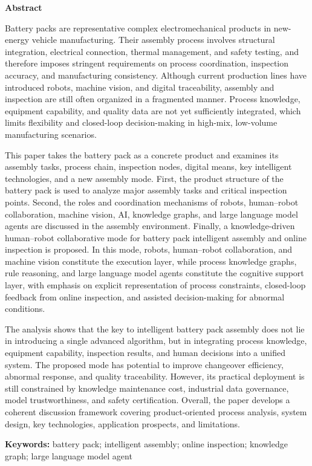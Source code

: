 \begin{center}
{\bfseries Abstract}
\end{center}

Battery packs are representative complex electromechanical products in new-energy vehicle manufacturing. Their assembly process involves structural integration, electrical connection, thermal management, and safety testing, and therefore imposes stringent requirements on process coordination, inspection accuracy, and manufacturing consistency. Although current production lines have introduced robots, machine vision, and digital traceability, assembly and inspection are still often organized in a fragmented manner. Process knowledge, equipment capability, and quality data are not yet sufficiently integrated, which limits flexibility and closed-loop decision-making in high-mix, low-volume manufacturing scenarios.

This paper takes the battery pack as a concrete product and examines its assembly tasks, process chain, inspection nodes, digital means, key intelligent technologies, and a new assembly mode. First, the product structure of the battery pack is used to analyze major assembly tasks and critical inspection points. Second, the roles and coordination mechanisms of robots, human--robot collaboration, machine vision, AI, knowledge graphs, and large language model agents are discussed in the assembly environment. Finally, a knowledge-driven human--robot collaborative mode for battery pack intelligent assembly and online inspection is proposed. In this mode, robots, human--robot collaboration, and machine vision constitute the execution layer, while process knowledge graphs, rule reasoning, and large language model agents constitute the cognitive support layer, with emphasis on explicit representation of process constraints, closed-loop feedback from online inspection, and assisted decision-making for abnormal conditions.

The analysis shows that the key to intelligent battery pack assembly does not lie in introducing a single advanced algorithm, but in integrating process knowledge, equipment capability, inspection results, and human decisions into a unified system. The proposed mode has potential to improve changeover efficiency, abnormal response, and quality traceability. However, its practical deployment is still constrained by knowledge maintenance cost, industrial data governance, model trustworthiness, and safety certification. Overall, the paper develops a coherent discussion framework covering product-oriented process analysis, system design, key technologies, application prospects, and limitations.

\vspace{1em}
\noindent\textbf{Keywords:} battery pack; intelligent assembly; online inspection; knowledge graph; large language model agent
